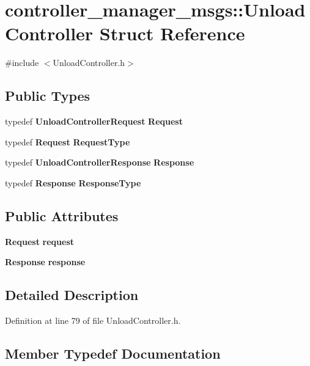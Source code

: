 \section{controller\-\_\-manager\-\_\-msgs\-:\-:\-Unload\-Controller \-Struct \-Reference}
\label{structcontroller__manager__msgs_1_1UnloadController}


{\ttfamily \#include $<$\-Unload\-Controller.\-h$>$}

\subsection*{\-Public \-Types}
\begin{DoxyCompactItemize}
\item 
typedef {\bf \-Unload\-Controller\-Request} {\bf \-Request}
\item 
typedef {\bf \-Request} {\bf \-Request\-Type}
\item 
typedef {\bf \-Unload\-Controller\-Response} {\bf \-Response}
\item 
typedef {\bf \-Response} {\bf \-Response\-Type}
\end{DoxyCompactItemize}
\subsection*{\-Public \-Attributes}
\begin{DoxyCompactItemize}
\item 
{\bf \-Request} {\bf request}
\item 
{\bf \-Response} {\bf response}
\end{DoxyCompactItemize}


\subsection{\-Detailed \-Description}


\-Definition at line 79 of file \-Unload\-Controller.\-h.



\subsection{\-Member \-Typedef \-Documentation}
